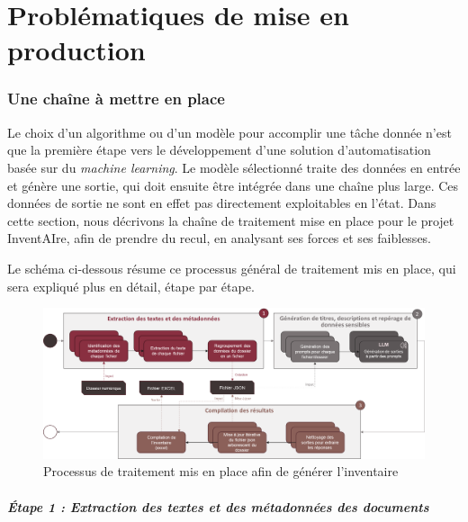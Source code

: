 \chapter{Problématiques de mise en production}


\subsection{Une \gls{chaîne} à mettre en place}

Le choix d'un algorithme ou d'un modèle pour accomplir une tâche donnée n'est que la première étape vers le développement d'une solution d'automatisation basée sur du \emph{machine learning}. 
Le modèle sélectionné traite des données en entrée et génère une sortie, qui doit ensuite être intégrée dans une \gls{chaîne} plus large. 
Ces données de sortie ne sont en effet pas directement exploitables en l'état. 
Dans cette section, nous décrivons la chaîne de traitement mise en place pour le projet InventAIre, afin de prendre du recul, en analysant ses forces et ses faiblesses.

Le schéma ci-dessous résume ce processus général de traitement mis en place, qui sera expliqué plus en détail, étape par étape.\newline
\begin{figure}[h!]
	\centerline{\includegraphics[width=\textwidth]{./media/process_traitement.png}}
	\caption{Processus de traitement mis en place afin de générer l'inventaire}
\end{figure}

\paragraph*{Étape 1 : Extraction des textes et des métadonnées des documents}\mbox{}\\

